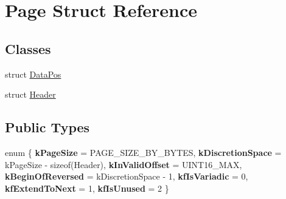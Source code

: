 \hypertarget{struct_page}{}\section{Page Struct Reference}
\label{struct_page}
\subsection*{Classes}
\begin{DoxyCompactItemize}
\item 
struct \mbox{\hyperlink{struct_page_1_1_data_pos}{Data\+Pos}}
\item 
struct \mbox{\hyperlink{struct_page_1_1_header}{Header}}
\end{DoxyCompactItemize}
\subsection*{Public Types}
\begin{DoxyCompactItemize}
\item 
\mbox{\label{struct_page_a3c82eff9368ad66b61ce10e982decc4e}} 
enum \{ \newline
{\bfseries k\+Page\+Size} = P\+A\+G\+E\+\_\+\+S\+I\+Z\+E\+\_\+\+B\+Y\+\_\+\+B\+Y\+T\+ES, 
{\bfseries k\+Discretion\+Space} = k\+Page\+Size -\/ sizeof(Header), 
{\bfseries k\+In\+Valid\+Offset} = U\+I\+N\+T16\+\_\+\+M\+AX, 
{\bfseries k\+Begin\+Of\+Reversed} = k\+Discretion\+Space -\/ 1, 
\newline
{\bfseries kf\+Is\+Variadic} = 0, 
{\bfseries kf\+Extend\+To\+Next} = 1, 
{\bfseries kf\+Is\+Unused} = 2
 \}
\end{DoxyCompactItemize}
